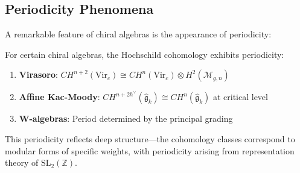 \subsection{Periodicity Phenomena}

A remarkable feature of chiral algebras is the appearance of periodicity:

\begin{theorem}
For certain chiral algebras, the Hochschild cohomology exhibits periodicity:
\begin{enumerate}
\item \textbf{Virasoro}: $CH^{n+2}(\text{Vir}_c) \cong CH^n(\text{Vir}_c) \otimes H^2(\mathcal{M}_{g,n})$ 
\item \textbf{Affine Kac-Moody}: $CH^{n+2h^\vee}(\widehat{\mathfrak{g}}_k) \cong CH^n(\widehat{\mathfrak{g}}_k)$ at critical level
\item \textbf{W-algebras}: Period determined by the principal grading
\end{enumerate}
\end{theorem}

This periodicity reflects deep structure—the cohomology classes correspond to modular forms of specific weights, with periodicity arising from representation theory of $\text{SL}_2(\mathbb{Z})$.

